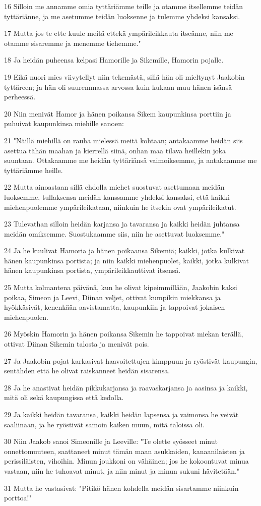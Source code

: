 \par 16 Silloin me annamme omia tyttäriämme teille ja otamme itsellemme teidän tyttäriänne, ja me asetumme teidän luoksenne ja tulemme yhdeksi kansaksi.
\par 17 Mutta jos te ette kuule meitä ettekä ympärileikkauta itseänne, niin me otamme sisaremme ja menemme tiehemme."
\par 18 Ja heidän puheensa kelpasi Hamorille ja Sikemille, Hamorin pojalle.
\par 19 Eikä nuori mies viivytellyt niin tekemästä, sillä hän oli mieltynyt Jaakobin tyttäreen; ja hän oli suuremmassa arvossa kuin kukaan muu hänen isänsä perheessä.
\par 20 Niin menivät Hamor ja hänen poikansa Sikem kaupunkinsa porttiin ja puhuivat kaupunkinsa miehille sanoen:
\par 21 "Näillä miehillä on rauha mielessä meitä kohtaan; antakaamme heidän siis asettua tähän maahan ja kierrellä siinä, onhan maa tilava heillekin joka suuntaan. Ottakaamme me heidän tyttäriänsä vaimoiksemme, ja antakaamme me tyttäriämme heille.
\par 22 Mutta ainoastaan sillä ehdolla miehet suostuvat asettumaan meidän luoksemme, tullaksensa meidän kanssamme yhdeksi kansaksi, että kaikki miehenpuolemme ympärileikataan, niinkuin he itsekin ovat ympärileikatut.
\par 23 Tulevathan silloin heidän karjansa ja tavaransa ja kaikki heidän juhtansa meidän omiksemme. Suostukaamme siis, niin he asettuvat luoksemme."
\par 24 Ja he kuulivat Hamoria ja hänen poikaansa Sikemiä; kaikki, jotka kulkivat hänen kaupunkinsa portista; ja niin kaikki miehenpuolet, kaikki, jotka kulkivat hänen kaupunkinsa portista, ympärileikkauttivat itsensä.
\par 25 Mutta kolmantena päivänä, kun he olivat kipeimmillään, Jaakobin kaksi poikaa, Simeon ja Leevi, Diinan veljet, ottivat kumpikin miekkansa ja hyökkäsivät, kenenkään aavistamatta, kaupunkiin ja tappoivat jokaisen miehenpuolen.
\par 26 Myöskin Hamorin ja hänen poikansa Sikemin he tappoivat miekan terällä, ottivat Diinan Sikemin talosta ja menivät pois.
\par 27 Ja Jaakobin pojat karkasivat haavoitettujen kimppuun ja ryöstivät kaupungin, sentähden että he olivat raiskanneet heidän sisarensa.
\par 28 Ja he anastivat heidän pikkukarjansa ja raavaskarjansa ja aasinsa ja kaikki, mitä oli sekä kaupungissa että kedolla.
\par 29 Ja kaikki heidän tavaransa, kaikki heidän lapsensa ja vaimonsa he veivät saaliinaan, ja he ryöstivät samoin kaiken muun, mitä taloissa oli.
\par 30 Niin Jaakob sanoi Simeonille ja Leeville: "Te olette syösseet minut onnettomuuteen, saattaneet minut tämän maan asukkaiden, kanaanilaisten ja perissiläisten, vihoihin. Minun joukkoni on vähäinen; jos he kokoontuvat minua vastaan, niin he tuhoavat minut, ja niin minut ja minun sukuni hävitetään."
\par 31 Mutta he vastasivat: "Pitikö hänen kohdella meidän sisartamme niinkuin porttoa!"

